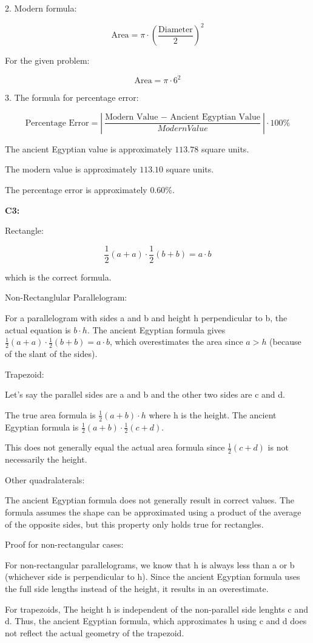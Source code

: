 \documentclass{article}
\begin{document}
2. Modern formula:

\[\text{Area} = \pi \cdot \left(\frac{\text{Diameter}}{2}\right)^2\]

For the given problem:

\[\text{Area} = \pi \cdot 6^2\]

3. The formula for percentage error:

\[\text{Percentage Error} = \left|\frac{\text{Modern Value $-$ Ancient Egyptian Value}}{Modern Value}\right| \cdot 100\%\]

The ancient Egyptian value is approximately $113.78$ square units.

The modern value is approximately $113.10$ square units.

The percentage error is approximately $0.60\%$.


\textbf{C3:}

Rectangle:

\[\frac{1}{2}(a + a) \cdot \frac{1}{2}(b + b) = a \cdot b\]

which is the correct formula.

Non-Rectanglular Parallelogram:

For a parallelogram with sides a and b and height h perpendicular to b, the actual
equation is $b \cdot h$. The ancient Egyptian formula gives
$\frac{1}{2}(a + a) \cdot \frac{1}{2}(b + b) = a \cdot b$, which overestimates
the area since $a > h$ (because of the slant of the sides).

Trapezoid:

Let's say the parallel sides are a and b and the other two sides are c and d.

The true area formula is $\frac{1}{2}(a + b) \cdot h$ where h is the height.
The ancient Egyptian formula is $\frac{1}{2}(a + b) \cdot \frac{1}{2}(c + d)$.

This does not generally equal the actual area formula since $\frac{1}{2}(c + d)$ is
not necessarily the height.

Other quadralaterals:

The ancient Egyptian formula does not generally result in correct values.
The formula assumes the shape can be approximated using a product of the average
of the opposite sides, but this property only holds true for rectangles.

Proof for non-rectangular cases:

For non-rectangular parallelograms, we know that h is always less than
a or b (whichever side is perpendicular to h). Since the ancient Egyptian formula
uses the full side lengths instead of the height, it results in an overestimate.

For trapezoids, The height h is independent of the non-parallel side lenghts c and d.
Thus, the ancient Egyptian formula, which approximates h using c and d does not
reflect the actual geometry of the trapezoid.
\end{document}
